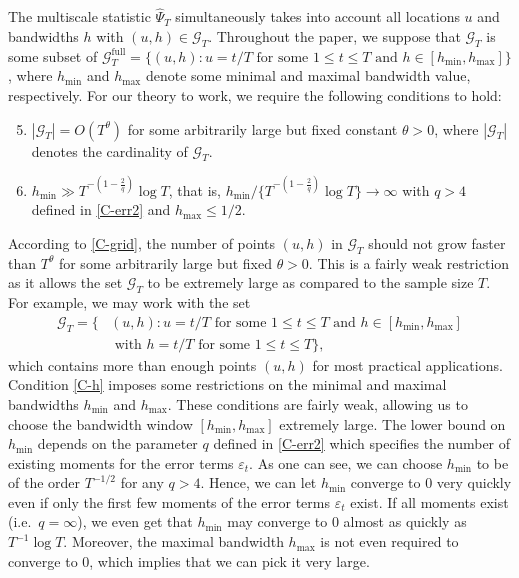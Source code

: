 The multiscale statistic $\widehat{\Psi}_T$ simultaneously takes into account all locations $u$ and bandwidths $h$ with $(u,h) \in \mathcal{G}_T$. Throughout the paper, we suppose that $\mathcal{G}_T$ is some subset of $\mathcal{G}_T^{\text{full}} = \{ (u,h): u = t/T \text{ for some } 1 \le t \le T \text{ and } h \in [h_{\min},h_{\max}] \}$, where $h_{\min}$ and $h_{\max}$ denote some minimal and maximal bandwidth value, respectively. For our theory to work, we require the following conditions to hold:
\begin{enumerate}[label=(C\arabic*),leftmargin=1.05cm]
\setcounter{enumi}{4}

\item \label{C-grid} $|\mathcal{G}_T| = O(T^\theta)$ for some arbitrarily large but fixed constant $\theta > 0$, where $|\mathcal{G}_T|$ denotes the cardinality of $\mathcal{G}_T$. 

\item \label{C-h} $h_{\min} \gg T^{-(1-\frac{2}{q})} \log T$, that is, $h_{\min} / \{ T^{-(1-\frac{2}{q})} \log T \} \rightarrow \infty$ with $q > 4$ defined in \ref{C-err2} and $h_{\max} \le 1/2$.

\end{enumerate}
According to \ref{C-grid}, the number of points $(u,h)$ in $\mathcal{G}_T$ should not grow faster than $T^\theta$ for some arbitrarily large but fixed $\theta > 0$. This is a fairly weak restriction as it allows the set $\mathcal{G}_T$ to be extremely large as compared to the sample size $T$. For example, we may work with the set 
\begin{align*}
\mathcal{G}_T = \big\{ & (u,h): u = t/T \text{ for some } 1 \le t \le T \text{ and } h \in [h_{\min},h_{\max}] \\ & \text{ with } h = t/T \text{ for some } 1 \le t \le T  \big\},
\end{align*}
which contains more than enough points $(u,h)$ for most practical applications. Condition \ref{C-h} imposes some restrictions on the minimal and maximal bandwidths $h_{\min}$ and $h_{\max}$. These conditions are fairly weak, allowing us to choose the bandwidth window $[h_{\min},h_{\max}]$ extremely large. The lower bound on $h_{\min}$ depends on the parameter $q$ defined in \ref{C-err2} which specifies the number of existing moments for the error terms $\varepsilon_t$. As one can see, we can choose $h_{\min}$ to be of the order $T^{-1/2}$ for any $q > 4$. Hence, we can let $h_{\min}$ converge to $0$ very quickly even if only the first few moments of the error terms $\varepsilon_t$ exist. If all moments exist (i.e.\ $q = \infty$), we even get that $h_{\min}$ may converge to $0$ almost as quickly as $T^{-1} \log T$. Moreover, the maximal bandwidth $h_{\max}$ is not even required to converge to $0$, which implies that we can pick it very large.


